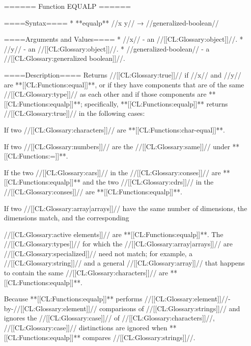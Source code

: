 ====== Function EQUALP ======

====Syntax====
  * **equalp** //x y// → //generalized-boolean//

====Arguments and Values====
  * //x// - an //[[CL:Glossary:object]]//.
  * //y// - an //[[CL:Glossary:object]]//.
  * //generalized-boolean// - a //[[CL:Glossary:generalized boolean]]//.

====Description====
Returns //[[CL:Glossary:true]]// if //x// and //y// are **[[CL:Functions:equal]]**, or if they have components that are of the same //[[CL:Glossary:type]]// as each other and if those components are **[[CL:Functions:equalp]]**; specifically, **[[CL:Functions:equalp]]** returns //[[CL:Glossary:true]]// in the following cases: \beginlist {}

If two //[[CL:Glossary:characters]]// are **[[CL:Functions:char-equal]]**.


If two //[[CL:Glossary:numbers]]// are the //[[CL:Glossary:same]]// under **[[CL:Functions:=]]**.


If the two //[[CL:Glossary:cars]]// in the //[[CL:Glossary:conses]]// are **[[CL:Functions:equalp]]** and the two //[[CL:Glossary:cdrs]]// in the //[[CL:Glossary:conses]]// are **[[CL:Functions:equalp]]**.


If two //[[CL:Glossary:array|arrays]]// have the same number of dimensions, the dimensions match, and the corresponding

//[[CL:Glossary:active elements]]// are **[[CL:Functions:equalp]]**. The //[[CL:Glossary:types]]// for which the //[[CL:Glossary:array|arrays]]// are //[[CL:Glossary:specialized]]// need not match; for example, a //[[CL:Glossary:string]]// and a general //[[CL:Glossary:array]]// that happens to contain the same //[[CL:Glossary:characters]]// are **[[CL:Functions:equalp]]**.

Because **[[CL:Functions:equalp]]** performs //[[CL:Glossary:element]]//-by-//[[CL:Glossary:element]]// comparisons of //[[CL:Glossary:strings]]// and ignores the //[[CL:Glossary:case]]// of //[[CL:Glossary:characters]]//, //[[CL:Glossary:case]]// distinctions are ignored when **[[CL:Functions:equalp]]** compares //[[CL:Glossary:strings]]//.


